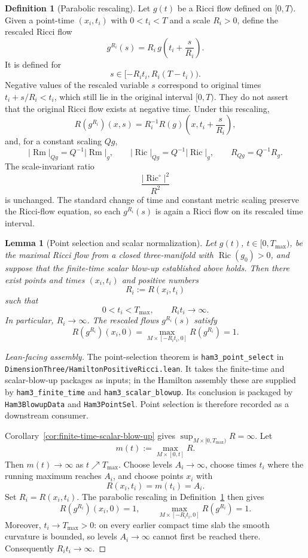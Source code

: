 \documentclass[11pt]{article}
\theoremstyle{plain}
\newtheorem{lemma}[theorem]{Lemma}
\theoremstyle{definition}
\newtheorem{definition}[theorem]{Definition}
\theoremstyle{remark}
\newcommand{\Ric}{\operatorname{Ric}}
\newcommand{\Rm}{\operatorname{Rm}}
\newcommand{\norm}[1]{\left|#1\right|}
\newcommand{\leanref}[1]{\nolinkurl{#1}}
\newcommand{\leanfile}[1]{\nolinkurl{#1}}
\newcommand{\rffile}[1]{\leanfile{#1}}
\begin{document}
\begin{definition}[Parabolic rescaling]
\label{def:parabolic-rescaling}
Let $g(t)$ be a Ricci flow defined on $[0,T)$. Given a point-time
$(x_i,t_i)$ with $0<t_i<T$ and a scale $R_i>0$, define the rescaled Ricci
flow
\[
g^{R_i}(s)=R_i\,g\left(t_i+\frac{s}{R_i}\right).
\]
It is defined for
\[
s\in[-R_it_i,R_i(T-t_i)).
\]
Negative values of the rescaled variable \(s\) correspond to original times
\(t_i+s/R_i<t_i\), which still lie in the original interval \([0,T)\).  They
do not assert that the original Ricci flow exists at negative time.
Under this rescaling,
\[
R(g^{R_i})(x,s)=R_i^{-1}R(g)\left(x,t_i+\frac{s}{R_i}\right),
\]
and, for a constant scaling $Qg$,
\[
\norm{\Rm}_{Qg}=Q^{-1}\norm{\Rm}_g,
\qquad
\norm{\Ric}_{Qg}=Q^{-1}\norm{\Ric}_g,
\qquad
R_{Qg}=Q^{-1}R_g.
\]
The scale-invariant ratio
\[
\frac{\norm{\Ric^\circ}^2}{R^2}
\]
is unchanged.  The standard change of time and constant metric scaling preserve
the Ricci-flow equation, so each \(g^{R_i}(s)\) is again a Ricci flow on its
rescaled time interval.
\end{definition}

\begin{lemma}[Point selection and scalar normalization]
\label{lem:point-selection-rescaling}
Let $g(t)$, $t\in[0,T_{\max})$, be the maximal Ricci flow from a closed
three-manifold with $\Ric(g_0)>0$, and suppose that the finite-time scalar
blow-up established above holds.  Then there exist points and times
$(x_i,t_i)$ and positive numbers
\[
R_i:=R(x_i,t_i)
\]
such that
\[
0<t_i<T_{\max},
\qquad
R_it_i\longrightarrow\infty.
\]
In particular, $R_i\to\infty$.  The rescaled flows $g^{R_i}(s)$ satisfy
\[
R(g^{R_i})(x_i,0)
=
\max_{M\times[-R_it_i,0]}R(g^{R_i})
=
1.
\]
\end{lemma}

\begin{proof}[Lean-facing assembly]
The point-selection theorem is \leanref{ham3_point_select} in
\rffile{DimensionThree/HamiltonPositiveRicci.lean}.  It takes the finite-time
and scalar-blow-up packages as inputs; in the Hamilton assembly these are
supplied by \leanref{ham3_finite_time} and \leanref{ham3_scalar_blowup}.
Its conclusion is packaged by \leanref{Ham3BlowupData} and
\leanref{Ham3PointSel}.  Point selection is therefore recorded as a downstream
consumer.

Corollary~\ref{cor:finite-time-scalar-blow-up} gives
\(\sup_{M\times[0,T_{\max})}R=\infty\).  Let
\[
  m(t):=\max_{M\times[0,t]}R.
\]
Then \(m(t)\to\infty\) as \(t\nearrow T_{\max}\).  Choose levels
\(A_i\to\infty\), choose times \(t_i\) where the running maximum reaches
\(A_i\), and choose points \(x_i\) with
\[
  R(x_i,t_i)=m(t_i)=A_i.
\]
Set \(R_i=R(x_i,t_i)\).  The parabolic rescaling in
Definition~\ref{def:parabolic-rescaling} then gives
\[
  R(g^{R_i})(x_i,0)=1,
  \qquad
  \max_{M\times[-R_it_i,0]}R(g^{R_i})=1.
\]
Moreover, $t_i\to T_{\max}>0$: on every earlier compact time slab the smooth
curvature is bounded, so levels $A_i\to\infty$ cannot first be reached there.
Consequently $R_it_i\to\infty$.
\end{proof}
\end{document}
